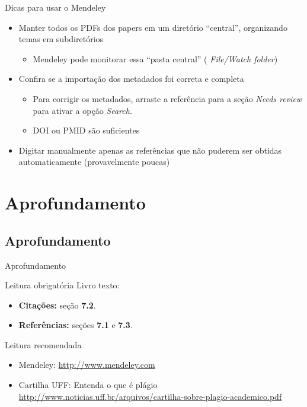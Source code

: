 \documentclass{beamer}
\begin{document}
\begin{frame}{Dicas para usar o Mendeley}
  \begin{itemize}
    \footnotesize
  \item Manter \alert{todos} os PDFs dos papers em um diretório
    ``central'', organizando temas em subdiretórios
    \begin{itemize}
      \scriptsize
    \item Mendeley pode \alert{monitorar} essa ``pasta central'' ({\em
        File/Watch folder})
    \end{itemize}
    \bigskip
  \item Confira se a importação dos metadados foi correta e completa
    \begin{itemize}
      \scriptsize
    \item Para corrigir os metadados, arraste a referência para a
      seção {\em Needs review} para ativar a opção {\em Search}.
    \item DOI ou PMID são suficientes
    \end{itemize}
    \bigskip
  \item Digitar manualmente apenas as referências que não puderem ser
    obtidas automaticamente (provavelmente poucas)
  \end{itemize}
\end{frame}

\section{Aprofundamento}

\subsection{Aprofundamento}

\begin{frame}{Aprofundamento}
  \begin{block}{Leitura obrigatória}
    Livro texto:
    \begin{itemize}
      \scriptsize
    \item {\bf Citações:} seção {\bf 7.2}.
    \item {\bf Referências:} seções {\bf 7.1} e {\bf 7.3}.
    \end{itemize}
  \end{block}
  \begin{block}{Leitura recomendada}
    \begin{itemize}
      \scriptsize
    \item Mendeley: {\tiny \url{http://www.mendeley.com}}
    \item Cartilha UFF: Entenda o que é plágio {\tiny \url{http://www.noticias.uff.br/arquivos/cartilha-sobre-plagio-academico.pdf}}
    \end{itemize}
  \end{block}
\end{frame}
\end{document}
